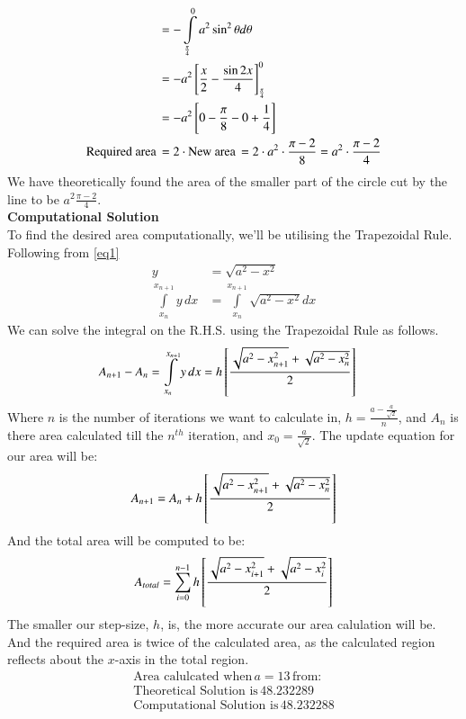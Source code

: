 \documentclass[journal]{IEEEtran}
\begin{document}
\begin{align}
	&= -\int\limits_{\frac{\pi}{4}}^{0} a^2 \sin^2\theta d\theta\\
	&= -a^2{}\left[\frac{x}{2}-\frac{\sin2x}{4}\right]_{\frac{\pi}{4}}^{0}\\
	&= -a^2{}\left[0 -\frac{\pi}{8} - 0 + \frac{1}{4}\right]\\
	\text{Required area}\, &= 2\cdot\text{New area} \, = 2\cdot a^2\cdot\frac{\pi-2}{8} = a^2\cdot\frac{\pi-2}{4}
\end{align}
We have theoretically found the area of the smaller part of the circle cut by the line to be $a^2 \frac{\pi-2}{4}$.\\
\textbf{Computational Solution}\\
To find the desired area computationally, we'll be utilising the Trapezoidal Rule.\\
Following from \ref{eq1}
\begin{align}
	y &= \sqrt{a^2-x^2} \nonumber\\
	\int\limits_{x_n}^{x_{n+1}} y \, dx &= \int\limits_{x_n}^{x_{n+1}} \sqrt{a^2-x^2} dx
\end{align}
We can solve the integral on the R.H.S. using the Trapezoidal Rule as follows.
\begin{align}
	A_{n+1}-A_{n} = 	\int\limits_{x_n}^{x_{n+1}} y \, dx &= h{}\left[\frac{\sqrt{a^2-x_{n+1}^2} + \sqrt{a^2-x_n^2}}{2}\right]
\end{align}
Where $n$ is the number of iterations we want to calculate in, $h = \frac{a-\frac{a}{\sqrt{2}}}{n}$, and $A_{n}$ is there area calculated till the $n^{th}$ iteration, and $x_0 = \frac{a}{\sqrt{2}}$.
The update equation for our area will be:
\begin{align}
	A_{n+1} = A_{n} +  h{}\left[\frac{\sqrt{a^2-x_{n+1}^2} + \sqrt{a^2-x_n^2}}{2}\right]
\end{align}
And the total area will be computed to be:
\begin{align}
	A_{total} = \sum\limits_{i = 0}^{n-1} h{}\left[\frac{\sqrt{a^2-x_{i+1}^2} + \sqrt{a^2-x_i^2}}{2}\right]
\end{align}
The smaller our step-size, $h$, is, the more accurate our area calulation will be.\\
And the required area is twice of the calculated area, as the calculated region reflects about the $x$-axis in the total region.
\begin{align*}
	\text{Area calulcated when}\, a=13 \,\text{from:}\\
	\text{Theoretical Solution is}\, 48.232289\\
	\text{Computational Solution is}\, 48.232288
\end{align*}
\end{document}
